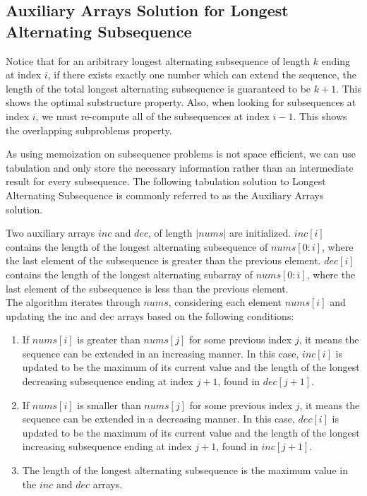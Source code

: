 \subsection{Auxiliary Arrays Solution for Longest Alternating Subsequence}
Notice that for an aribitrary longest alternating subsequence of length $k$ ending at index $i$,
if there exists exactly one number which can extend the sequence,
the length of the total longest alternating subsequence is guaranteed to be $k+1$.
This shows the optimal substructure property.
Also, when looking for subsequences at index $i$,
we must re-compute all of the subsequences at index $i-1$.
This shows the overlapping subproblems property.

As using memoization on subsequence problems is not space efficient,
we can use tabulation and only store the necessary information rather than an intermediate result for every subsequence.
The following tabulation solution to Longest Alternating Subsequence is commonly referred to as the Auxiliary Arrays solution.

Two auxiliary arrays $inc$ and $dec$, of length $|nums|$ are initialized.
$inc[i]$ contains the length of the longest alternating subsequence of $nums[0:i]$,
where the last element of the subsequence is greater than the previous element.
$dec[i]$ contains the length of the longest alternating subarray of $nums[0:i]$,
where the last element of the subsequence is less than the previous element.\\

The algorithm iterates through $nums$, considering each element $nums[i]$ and updating the inc and dec arrays based on the following conditions:
\newpage

\begin{enumerate}
    \item If $nums[i]$ is greater than $nums[j]$ for some previous index $j$, it means the sequence can be extended in an increasing manner.
    In this case, $inc[i]$ is updated to be the maximum of its current value and the length of the longest decreasing subsequence ending at index $j+1$, found in $dec[j+1]$.

    \item If $nums[i]$ is smaller than $nums[j]$ for some previous index $j$, it means the sequence can be extended in a decreasing manner.
    In this case, $dec[i]$ is updated to be the maximum of its current value and the length of the longest increasing subsequence ending at index $j+1$, found in $inc[j+1]$.

    \item The length of the longest alternating subsequence is the maximum value in the $inc$ and $dec$ arrays.
\end{enumerate}


